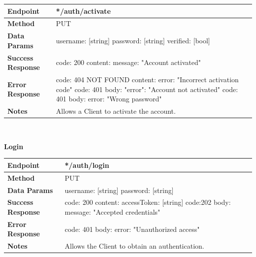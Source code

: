 \documentclass{report}
\begin{document}
    \begin{tabular}{| l | p{8cm} |}
        \hline
        \textbf{Endpoint} & */auth/activate \\
        \hline
        \textbf{Method} & PUT \\
        \hline
        \textbf{Data Params} & username: [string] \newline password: [string] \newline verified: [bool]\\
        \hline
        \textbf{Success Response} & code: 200 \newline content: {message: "Account activated"}\\
        \hline
        \textbf{Error Response} & code: 404 NOT FOUND \newline content: {error: "Incorrect activation code"} \newline \newline code: 401 \newline body: {"error": "Account not activated"} \newline \newline code: 401 \newline body: {error: "Wrong password"} \\
        \hline
        \textbf{Notes} & Allows a Client to activate the account. \\
        \hline
    \end{tabular}
\\
\begin{center}{\textbf{Login}}\end{center}
\begin{tabular}{| l | p{8cm} |}
	\hline
	\textbf{Endpoint} & */auth/login \\
	\hline
	\textbf{Method} & PUT \\
	\hline
	\textbf{Data Params} & username: [string] \newline password: [string]\\
	\hline
	\textbf{Success Response} & code: 200 \newline content: {accessToken: [string]} \newline \newline code:202 \newline body: {message: "Accepted credentials"}\\
	\hline
    \textbf{Error Response} & code: 401 \newline body: {error: "Unauthorized access"} \\
	\hline
	\textbf{Notes} & Allows the Client to obtain an authentication. \\
	\hline
\end{tabular}
\end{document}
